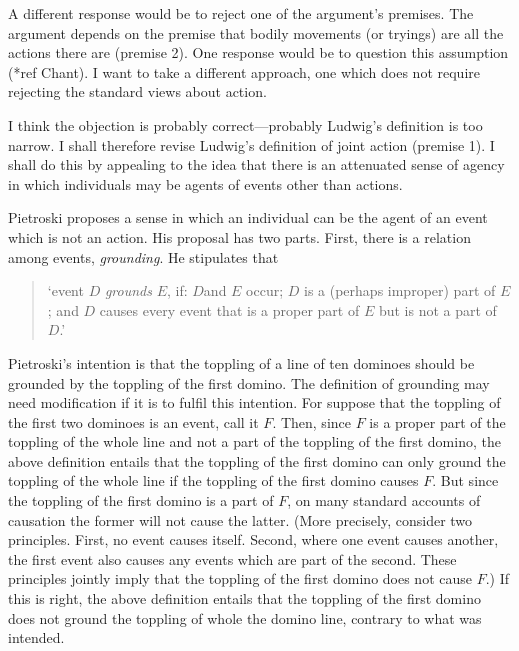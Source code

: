 \documentclass[12pt,a4paper]{extarticle}
\begin{document}
A different response would be to reject one of the argument's premises.
The argument depends on the premise that bodily movements (or tryings) are all the actions there are (premise 2).
One response would be to question this assumption (*ref Chant).
I want to take a different approach, one which does not require rejecting the standard views about action.

I think the objection is probably correct---probably Ludwig's definition is too narrow.
I shall therefore revise Ludwig's definition of joint action (premise 1).  
I shall do this by appealing to the idea that there is an attenuated sense of agency in which individuals may be agents of events other than actions.

Pietroski proposes a sense in which an individual can be the agent of an event which is not an action.  His proposal has two parts.  First, there is a relation among events, \emph{grounding}.  
He stipulates that 
%
\begin{quote}
`event $D$ \emph{grounds} $E$, if: $D$and $E$ occur; 
$D$ is a (perhaps improper) part of $E$; and 
$D$ causes every event that is a proper part of $E$ but is not a part of $D$.'
\citep[p.\ 81]{pietroski_actions_1998}
\end{quote}
%
Pietroski's intention is that the toppling of a line of ten dominoes should be grounded by the toppling of the first domino.
The definition of grounding may need modification if it is to fulfil this intention.
For suppose that the toppling of the first two dominoes is an event, call it $F$.
Then, since $F$ is a proper part of the toppling of the whole line and not a part of the toppling of the first domino,
the above definition entails that
the toppling of the first domino can only ground the toppling of the whole line if the toppling of the first domino causes $F$.
But since the toppling of the first domino is a part of $F$, on many standard accounts of causation the former will not cause the latter.
(More precisely, consider two principles.  
First, no event causes itself.  
Second, where one event causes another, the first event also causes any events which are part of the second.  
These principles jointly imply that the toppling of the first domino does not cause $F$.)
If this is right, the above definition entails that the toppling of the first domino does not ground the toppling of whole the domino line, contrary to what was intended.
\end{document}
